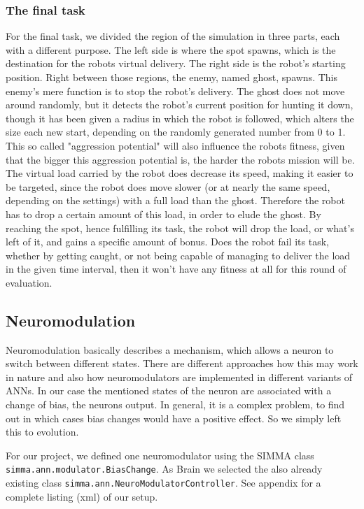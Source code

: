 \documentclass[12pt,fleqn,a4paper]{article}
\begin{document}
\subsubsection{The final task}
For the final task, we divided the region of the simulation in three parts, each with a different purpose. The left side is where the spot spawns, which is the destination for the robots virtual delivery. The right side is the robot's 
starting position. Right between those regions, the enemy, named ghost, spawns. This enemy's mere function is to stop the robot's delivery. The ghost does not move around randomly, but it detects the robot's current position for hunting it down, though it has been given a radius in which the robot is followed, which alters the size each new start, depending on the randomly generated number from 0 to 1. This so called "aggression potential" will also influence the robots fitness, given that the bigger this aggression potential is, the harder the robots mission will be. The virtual load carried by the robot does decrease its speed, making it easier to be targeted, since the robot does move slower (or at nearly the same speed, depending on the settings) with a full load than the ghost. Therefore the robot has to drop a certain amount of this load, in order to elude the ghost. By reaching the spot, hence fulfilling its task, the robot will drop the load, or what's left of it, and gains a specific amount of bonus. Does the robot fail its task, whether by getting caught, or not being capable of managing to deliver the load in the given time interval, then it won't have any fitness at all for this round of evaluation.

\subsection{Neuromodulation}
Neuromodulation basically describes a mechanism, which allows a neuron to switch between different states. There are different approaches how this may work in nature and also how neuromodulators are implemented in different variants of ANNs. In our case the mentioned states of the neuron are associated with a change of bias, the neurons output. In general, it is a complex problem, to find out in which cases bias changes would have a positive effect. So we simply left this to evolution.

For our project, we defined one neuromodulator using the SIMMA class\\ \texttt{simma.ann.modulator.BiasChange}. As Brain we selected the also already existing class \texttt{simma.ann.NeuroModulatorController}. See appendix for a complete listing (xml) of our setup.
\end{document}
